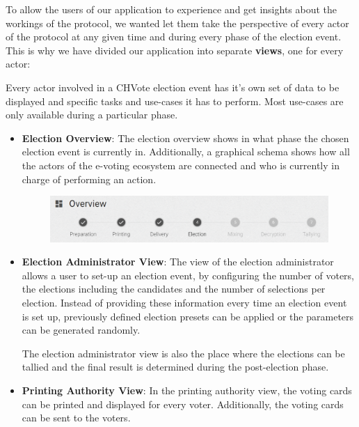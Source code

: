 To allow the users of our application to experience and get insights about the workings of the protocol, we wanted let them take the perspective of every actor of the protocol at any given time and during every phase of the election event. This is why we have divided our application into separate \textbf{views}, one for every actor:

Every actor involved in a CHVote election event has it's own set of data to be displayed and specific tasks and use-cases it has to perform. Most use-cases are only available during a particular phase.

\begin{itemize}
	\item \textbf{Election Overview}: The election overview shows in what phase the chosen election event is currently in. Additionally, a graphical schema shows how all the actors of the e-voting ecosystem are connected and who is currently in charge of performing an action.
\begin{figure}
\begin{center}
\includegraphics[scale=0.50]{assets/screenshots/overview.PNG}
\label{Election Overview}%
\end{center}
\end{figure}

	\item \textbf{Election Administrator View}: The view of the election administrator allows a user to set-up an election event, by configuring the number of voters, the elections including the candidates and the number of selections per election. Instead of providing these information every time an election event is set up, previously defined election presets can be applied or the parameters can be generated randomly.

The election administrator view is also the place where the elections can be tallied and the final result is determined during the post-election phase.
	\item \textbf{Printing Authority View}: In the printing authority view, the voting cards can be printed and displayed for every voter. Additionally, the voting cards can be sent to the voters.


\end{itemize}
